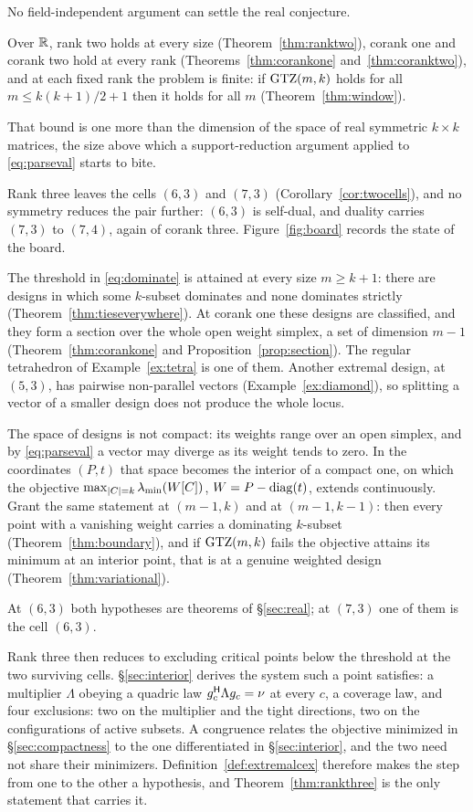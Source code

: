 No field-independent argument can settle the real conjecture.

Over $\mathbb{R}$, rank two holds at every size (Theorem~\ref{thm:ranktwo}),
corank one and corank two hold at every rank (Theorems~\ref{thm:corankone}
and~\ref{thm:coranktwo}), and at each fixed rank the problem is finite: if
$\mathrm{GTZ}(m,k)$ holds for all $m\le k(k+1)/2+1$ then it holds for all $m$
(Theorem~\ref{thm:window}).

That bound is one more than the dimension of the space of real symmetric
$k\times k$ matrices, the size above which a support-reduction argument
applied to \eqref{eq:parseval} starts to bite.

Rank three leaves the cells $(6,3)$ and $(7,3)$
(Corollary~\ref{cor:twocells}), and no symmetry reduces the pair further:
$(6,3)$ is self-dual, and duality carries $(7,3)$ to $(7,4)$, again of
corank three.  Figure~\ref{fig:board} records the state of the board.

The threshold in \eqref{eq:dominate} is attained at every size
$m\ge k+1$: there are designs in which some $k$-subset dominates and none
dominates strictly (Theorem~\ref{thm:tieseverywhere}).  At corank one
these designs are classified, and they form a section over the whole open
weight simplex, a set of dimension $m-1$ (Theorem~\ref{thm:corankone} and
Proposition~\ref{prop:section}).
The regular tetrahedron of Example~\ref{ex:tetra} is one of them.  Another
extremal design, at $(5,3)$, has pairwise non-parallel vectors
(Example~\ref{ex:diamond}), so splitting a vector of a smaller design
does not produce the whole locus.

The space of designs is not compact: its weights range over an open
simplex, and by \eqref{eq:parseval} a vector may diverge as its weight
tends to zero.  In the coordinates $(P,t)$ that space becomes the
interior of a compact one, on which the objective
$\max_{\lvert C\rvert=k}\lambda_{\min}(W[C])$, $W=P-\operatorname{diag}(t)$, extends
continuously.  Grant the same statement at $(m-1,k)$ and at $(m-1,k-1)$:
then every point with a vanishing weight carries a dominating $k$-subset
(Theorem~\ref{thm:boundary}), and if $\mathrm{GTZ}(m,k)$ fails the objective
attains its minimum at an interior point, that is at a genuine weighted
design (Theorem~\ref{thm:variational}).

At $(6,3)$ both hypotheses are theorems of \S\ref{sec:real}; at $(7,3)$
one of them is the cell $(6,3)$.

Rank three then reduces to excluding critical points below the threshold
at the two surviving cells.  \S\ref{sec:interior} derives the system such
a point satisfies: a multiplier $\Lambda$ obeying a quadric law
$g_c^{\mathsf{H}}\Lambda g_c=\nu$ at every $c$, a coverage law, and four
exclusions: two on the multiplier and the tight directions, two on the
configurations of active subsets.
A congruence relates the objective minimized in \S\ref{sec:compactness}
to the one differentiated in \S\ref{sec:interior}, and the two need not
share their minimizers.  Definition~\ref{def:extremalcex} therefore makes
the step from one to the other a hypothesis, and
Theorem~\ref{thm:rankthree} is the only statement that carries it.

